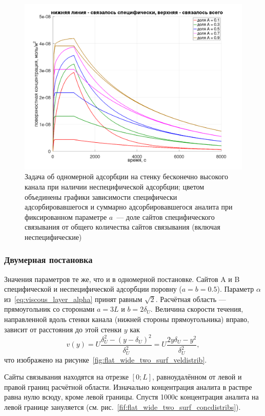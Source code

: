 \documentclass[oneside,final,12pt]{extreport}
\begin{document}
\begin{figure}
  \centering
  \includegraphics[width=.7\textwidth]{pic/flat_wide_twosurf_fracs_a_sum}

  \caption{%
    \label{fig:wide_two_surf_fracs_a_sum}%
    Задача об одномерной адсорбции на стенку бесконечно высокого канала
    при наличии неспецифической адсорбции;
    цветом объединены графики зависимости специфически адсорбировавшегося и
    суммарно адсорбировавшегося аналита при фиксированном параметре $a$~---
    доле сайтов специфического связывания от общего количества сайтов связывания
    (включая неспецифические)
  }

\end{figure}


\subsubsection*{Двумерная постановка}
Значения параметров те же, что и в одномерной постановке.
Сайтов A и B специфической и неспецифической адсорбции поровну ($a = b = 0.5$).
Параметр $\alpha$ из~\eqref{eq:viscous_layer_alpha} принят равным $\sqrt{2}$.
Расчётная область --- прямоугольник со сторонами $a = 3 L$ и $b = 2 \delta_U$.
Величина скорости течения, направленной вдоль стенки канала
(нижней стороны прямоугольника) вправо,
зависит от расстояния до этой стенки $y$ как
\begin{equation}
  v(y) = U \frac{\delta_U^2 - \left(y - \delta_U\right)^2}{\delta_U^2}
       = U \frac{2 y \delta_U - y^2}{\delta_U^2},
  \label{eq:flat_wide_plate_v(y)}
\end{equation}
что изображено на рисунке~\ref{fig:flat_wide_two_surf_veldistrib}.

Сайты связывания находятся на отрезке $\left[0;L\right]$,
равноудалённом от левой и правой границ расчётной области.
Изначально концентрация аналита в раствре равна нулю всюду, кроме левой границы.
Спустя 1000с концентрация аналита на левой границе зануляется
(см. рис.~\ref{fif:flat_wide_two_surf_concdistribs}).
\end{document}
